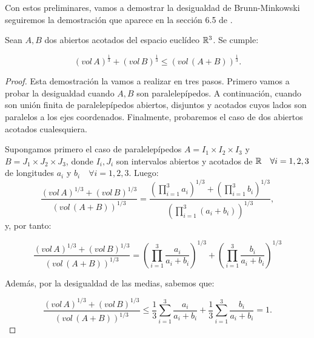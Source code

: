 Con estos preliminares, vamos a demostrar la desigualdad de Brunn-Minkowski seguiremos la demostración que aparece en la sección 6.5 de \cite{montielrosbook}.

\begin{theorem}
Sean $A, B$ dos abiertos acotados del espacio euclídeo $\mathbb{R}^3$. Se cumple:

\begin{equation*}
    (vol \, A)^{\frac{1}{3}} + (vol \, B)^{\frac{1}{3}} \leq (vol \, (A+B))^{\frac{1}{3}}.
\end{equation*}
\end{theorem}
\begin{proof}
Esta demostración la vamos a realizar en tres pasos. Primero vamos a probar la desigualdad cuando $A,B$ son paralelepípedos. A continuación, cuando son unión finita de paralelepípedos abiertos, disjuntos y acotados cuyos lados son paralelos a los ejes coordenados. Finalmente, probaremos el caso de dos abiertos acotados cualesquiera.

Supongamos primero el caso de paralelepípedos $A = I_1 \times I_2 \times I_3$ y $B = J_1 \times J_2 \times J_3$, donde $I_i,J_i$ son intervalos abiertos y acotados de $\mathbb{R} \quad \forall i=1,2,3$ de longitudes $a_i$ y $b_i \quad \forall i=1,2,3$. Luego:
%
\begin{equation*}
    \frac{ \left(vol \, A \right)^{1/3} + \left(vol \, B \right)^{1/3}}{\left(vol \, (A+B) \right)^{1/3}} = \frac{\left(\displaystyle\prod_{i=1}^3 a_i \right)^{1/3} + \left(\displaystyle\prod_{i=1}^3 b_i \right)^{1/3}}{\left(\displaystyle\prod_{i=1}^3 (a_i+b_i) \right)^{1/3}},
\end{equation*}
%
y, por tanto:

\begin{equation*}
    \frac{ \left(vol \, A \right)^{1/3} + \left(vol \, B \right)^{1/3}}{\left(vol \, (A+B) \right)^{1/3}} = \left(\displaystyle\prod_{i=1}^3 \frac{a_i}{a_i+b_i} \right)^{1/3} + \left(\displaystyle\prod_{i=1}^3 \frac{b_i}{a_i+b_i} \right)^{1/3}
\end{equation*}

Además, por la desigualdad de las medias, sabemos que:

\begin{equation*}
    \frac{ \left(vol \, A \right)^{1/3} + \left(vol \, B \right)^{1/3}}{\left(vol \, (A+B) \right)^{1/3}} \leq
    \frac{1}{3} \displaystyle\sum_{i=1}^3 \frac{a_i}{a_i+b_i} + \frac{1}{3} \displaystyle\sum_{i=1}^3 \frac{b_i}{a_i+b_i} = 1.
\end{equation*}


\end{proof}
